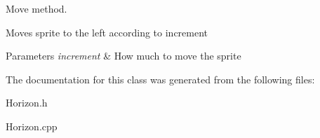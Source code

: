 Move method. 

Moves sprite to the left according to increment 
\begin{DoxyParams}{Parameters}
{\em increment} & How much to move the sprite \\
\hline
\end{DoxyParams}


The documentation for this class was generated from the following files\+:\begin{DoxyCompactItemize}
\item 
Horizon.\+h\item 
Horizon.\+cpp\end{DoxyCompactItemize}
